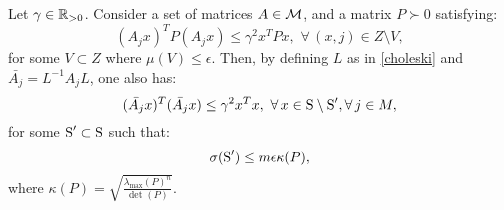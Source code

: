 \begin{theorem}\label{thm:mainTheorem01}Let $\gamma \in \mathbb{R}_{> 0}$. Consider a set of matrices $A \in \mathcal{M}$, and a matrix $P \succ 0$ satisfying:
\begin{equation}\label{eqn:P}(A_j x)^TP(A_j x) \leq {\gamma}^2x^TPx,\,\, \forall\, (x, j) \in Z \setminus V,\end{equation}
for some $V \subset Z$ where $\mu(V) \leq \epsilon$. Then, by defining $L$ as in \eqref{choleski} and $\bar{A_j}=  L^{-1}A_jL$, one also has:
\begin{equation*}\label{eqn:thm01-2}(\bar{A_j} x)^T(\bar{A_j} x) \leq {\gamma}^2x^Tx,\,\, \forall\, x \in \text{S} \setminus \text{S}', \forall\, j \in M,\end{equation*}
for some $\text{S}' \subset \text{S}$ such that: $$\sigma(\text{S}') \leq m\epsilon \kappa(P),$$
where $\kappa(P) = \sqrt{\frac{\lambda_{\max}(P)^n}{\det(P)}}$.
\end{theorem}

